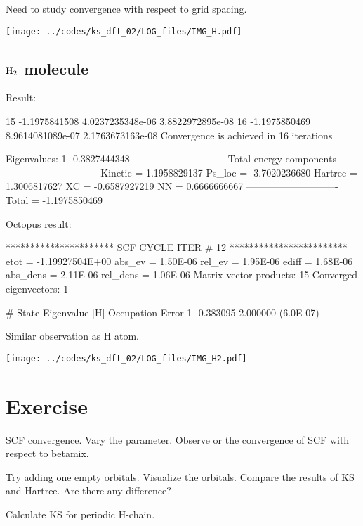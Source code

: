 Need to study convergence with respect to grid spacing.

{\centering
\texttt{[image: ../codes/ks\_dft\_02/LOG\_files/IMG\_H.pdf]}
}

\subsection{$\ce{H2}$ molecule}

Result:
\begin{textcode}
  15      -1.1975841508   4.0237235348e-06   3.8822972895e-08
  16      -1.1975850469   8.9614081089e-07   2.1763673163e-08
Convergence is achieved in 16 iterations

Eigenvalues:
 1      -0.3827444348
----------------------------
Total energy components
----------------------------
Kinetic =       1.1958829137
Ps_loc  =      -3.7020236680
Hartree =       1.3006817627
XC      =      -0.6587927219
NN      =       0.6666666667
----------------------------
Total   =      -1.1975850469
\end{textcode}

Octopus result:
\begin{fullwidth}
\begin{textcode}
********************** SCF CYCLE ITER #   12 ************************
 etot  = -1.19927504E+00 abs_ev   =  1.50E-06 rel_ev   =  1.95E-06
 ediff =        1.68E-06 abs_dens =  2.11E-06 rel_dens =  1.06E-06
Matrix vector products:     15
Converged eigenvectors:      1

#  State  Eigenvalue [H]  Occupation    Error
      1       -0.383095    2.000000   (6.0E-07) 
\end{textcode}
\end{fullwidth}

Similar observation as H atom.

{\centering
\texttt{[image: ../codes/ks\_dft\_02/LOG\_files/IMG\_H2.pdf]}
}

\section{Exercise}

SCF convergence. Vary the  parameter. Observe or the convergence
of SCF with respect to betamix.

Try adding one empty orbitals. Visualize the orbitals. Compare the results of
KS and Hartree. Are there any difference?

Calculate KS for periodic H-chain.